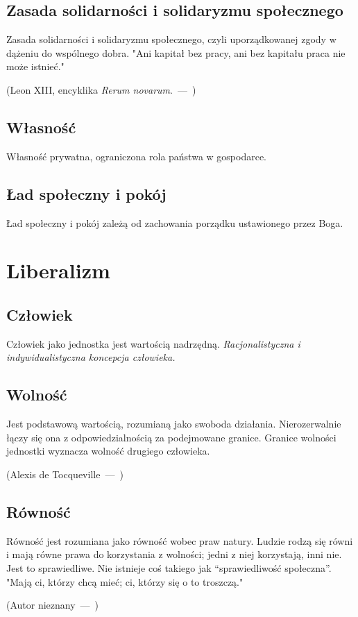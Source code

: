 \documentclass{article}
\let\oldquote\quote
\let\endoldquote\endquote
\renewenvironment{quote}[2][]
  {\if\relax\detokenize{#1}\relax
     \def\quoteauthor{#2}%
   \else
     \def\quoteauthor{#2~---~#1}%
   \fi
   \oldquote}
  {\par\nobreak\smallskip\hfill(\quoteauthor)%
   \endoldquote\addvspace{\bigskipamount}}
\begin{document}
\subsection{Zasada solidarności i solidaryzmu społecznego}
Zasada solidarności i solidaryzmu społecznego, czyli uporządkowanej zgody w dążeniu do wspólnego dobra.
\begin{quote}{Leon XIII, encyklika \emph{Rerum novarum}.}
    "Ani kapitał bez pracy, ani bez kapitału praca nie może istnieć."
\end{quote}
\subsection{Własność}
Własność prywatna, ograniczona rola państwa w gospodarce.
\subsection{Ład społeczny i pokój}
Ład społeczny i pokój zależą od zachowania porządku ustawionego przez Boga.
\section{Liberalizm}
\subsection{Człowiek}
Człowiek jako jednostka jest wartością nadrzędną.
\emph{Racjonalistyczna i indywidualistyczna koncepcja człowieka.}
\subsection{Wolność}
Jest podstawową wartością, rozumianą jako swoboda działania.
Nierozerwalnie łączy się ona z odpowiedzialnością za podejmowane granice.
\begin{quote}{Alexis de Tocqueville}
    Granice wolności jednostki wyznacza wolność drugiego człowieka.
\end{quote}
\subsection{Równość}
Równość jest rozumiana jako równość wobec praw natury. Ludzie rodzą się równi i
mają równe prawa do korzystania z wolności; jedni z niej korzystają, inni nie.
Jest to sprawiedliwe. Nie istnieje coś takiego jak ``sprawiedliwość społeczna''.
\begin{quote}{Autor nieznany}
    "Mają ci, którzy chcą mieć; ci, którzy się o to troszczą."
\end{quote}
\end{document}
